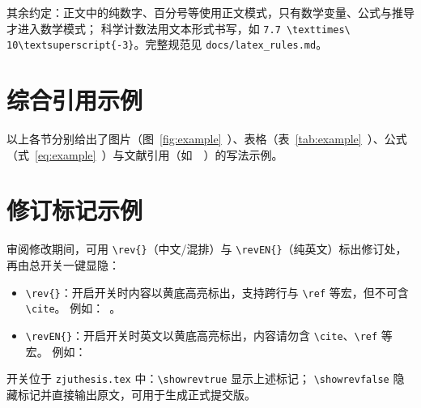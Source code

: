 其余约定：正文中的纯数字、百分号等使用正文模式，只有数学变量、公式与推导才进入数学模式；
科学计数法用文本形式书写，如 \verb|7.7 \texttimes\ 10\textsuperscript{-3}|。完整规范见 \texttt{docs/latex\_rules.md}。

\section{综合引用示例}

以上各节分别给出了图片（图~\ref{fig:example}~）、表格（表~\ref{tab:example}~）、公式（式~\eqref{eq:example}~）与文献引用（如~\cite{sutton2018reinforcement, quigley2009ros}~）的写法示例。

\section{修订标记示例}

审阅修改期间，可用 \verb|\rev{}|（中文/混排）与 \verb|\revEN{}|（纯英文）标出修订处，再由总开关一键显隐：

\begin{itemize}
    \item \verb|\rev{}|：开启开关时内容以黄底高亮标出，支持跨行与 \verb|\ref| 等宏，但不可含 \verb|\cite|。
          例如：~\cite{sutton2018reinforcement}。
    \item \verb|\revEN{}|：开启开关时英文以黄底高亮标出，内容请勿含 \verb|\cite|、\verb|\ref| 等宏。
          例如：
\end{itemize}

开关位于 \texttt{zjuthesis.tex} 中：\verb|\showrevtrue| 显示上述标记；
\verb|\showrevfalse| 隐藏标记并直接输出原文，可用于生成正式提交版。

